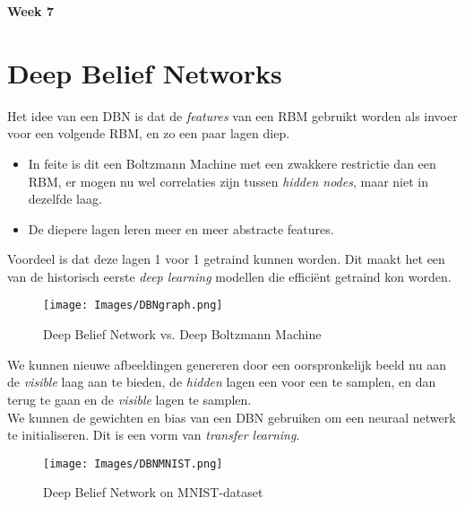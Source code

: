 {\large
\textbf{{\LARGE Week 7}}
\section{Deep Belief Networks}
Het idee van een DBN is dat de \textit{features} van een RBM gebruikt worden als invoer voor een volgende RBM, en zo een paar lagen diep.
\begin{itemize}
    \item In feite is dit een Boltzmann Machine met een zwakkere restrictie dan een RBM, er mogen nu wel correlaties zijn tussen \textit{hidden nodes}, maar niet in dezelfde laag. 
    \item De diepere lagen leren meer en meer abstracte features.
\end{itemize}
\noindent Voordeel is dat deze lagen 1 voor 1 getraind kunnen worden. Dit maakt het een van de historisch eerste \textit{deep learning} modellen die efficiënt getraind kon worden.\\

\begin{figure}[h]
    \centering
    \texttt{[image: Images/DBNgraph.png]}
    \caption{Deep Belief Network vs. Deep Boltzmann Machine}
    \label{fig:DBNvsDBM}
\end{figure}

\noindent We kunnen nieuwe afbeeldingen genereren door een oorspronkelijk beeld nu aan de \textit{visible} laag aan te bieden, de \textit{hidden} lagen een voor een te samplen, en dan terug te gaan en de \textit{visible} lagen te samplen.\\

\noindent We kunnen de gewichten en bias van een DBN gebruiken om een neuraal netwerk te initialiseren. Dit is een vorm van \textit{transfer learning}.

\begin{figure}[h]
    \centering
    \texttt{[image: Images/DBNMNIST.png]}
    \caption{Deep Belief Network on MNIST-dataset}
    \label{fig:DBN}
\end{figure}









}
